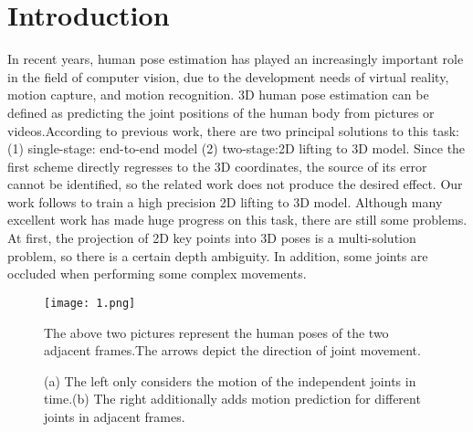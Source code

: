 \documentclass{article}
\begin{document}
\section{Introduction}
In recent years, human pose estimation has played an increasingly important role in the field of computer vision, due to the development needs of virtual reality, motion capture, and motion recognition. 3D human pose estimation can be defined as predicting the joint positions of the human body from pictures or videos.According to previous work, there are two principal solutions to this task: (1) single-stage: end-to-end model (2) two-stage:2D lifting to 3D model. Since the first scheme directly regresses to the 3D coordinates, the source of its error cannot be identified, so the related work \cite{Pavlakos_2018_CVPR,moon2020i2l} does not produce the desired effect. Our work follows \cite{cai2019exploiting,chen2021anatomy,liu2020attention,martinez2017simple,zhang2022mixste} to train a high precision 2D lifting to 3D model. Although many excellent work \cite{zheng20213d,li2022mhformer,zhang2022mixste} has made huge progress on this task, there are still some problems. At first, the projection of 2D key points into 3D poses is a multi-solution problem, so there is a certain depth ambiguity.  In addition, some joints are occluded when performing some complex movements.
\begin{figure}[h]
\centering
\texttt{[image: 1.png]}
\caption{\label{fig1}The above two pictures represent the human poses of the two adjacent frames.The arrows depict the direction of joint movement.}
\end{figure}

\begin{figure}[htbp]
\centering
{}

\centering
\caption{\label{fig2}(a) The left only considers the motion of the independent joints in time.(b) The right additionally adds motion prediction for different joints in adjacent frames.}
\end{figure}
\end{document}
